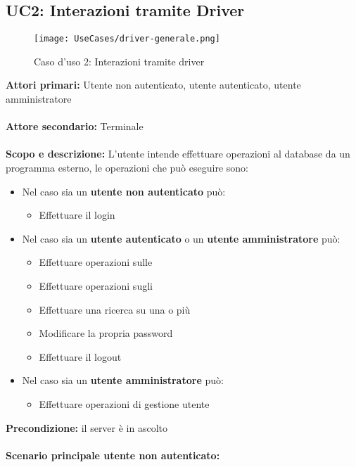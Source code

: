 \documentclass{scalatekids-article}
\begin{document}
\subsection{UC2: Interazioni tramite Driver}
\begin{figure}[H]
  \begin{center}
    \texttt{[image: UseCases/driver-generale.png]}
    \caption*{Caso d'uso 2: Interazioni tramite driver}
  \end{center}
\end{figure}
\textbf{Attori primari:} Utente non autenticato, utente autenticato, utente amministratore\\ \\
\textbf{Attore secondario:} Terminale\\ \\
\textbf{Scopo e descrizione:} L'utente intende effettuare operazioni al database da un programma  esterno, le operazioni che può eseguire sono:
\begin{itemize}
  \item Nel caso sia un \textbf{utente non autenticato} può:
  \begin{itemize}
    \item Effettuare il login
  \end{itemize}
  \item Nel caso sia un \textbf{utente autenticato} o un \textbf{utente amministratore} può:
  \begin{itemize}
    \item Effettuare operazioni sulle 
    \item Effettuare operazioni sugli 
    \item Effettuare una ricerca su una o più 
    \item Modificare la propria password
    \item Effettuare il logout
  \end{itemize}
  \item Nel caso sia un \textbf{utente amministratore} può:
  \begin{itemize}
    \item Effettuare operazioni di gestione utente
  \end{itemize}
\end{itemize}
\textbf{Precondizione:} il server è in ascolto\\ \\
\textbf{Scenario principale utente non autenticato:} 
\end{document}

